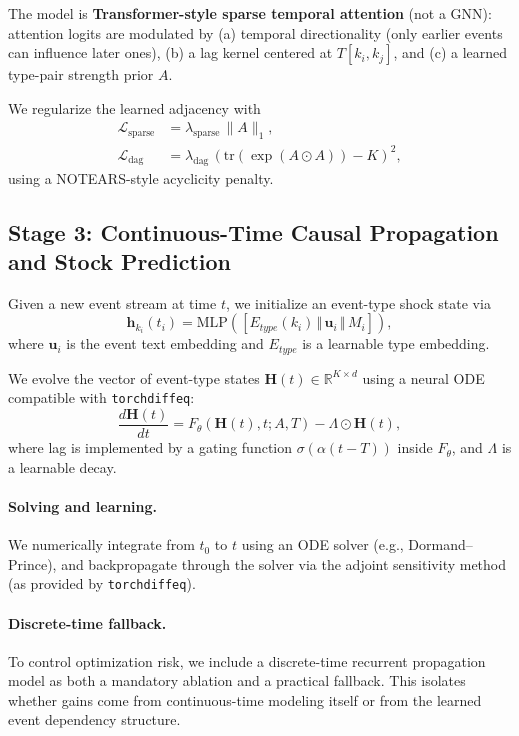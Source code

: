 \documentclass[sigconf,review]{acmart}
\begin{document}
The model is \textbf{Transformer-style sparse temporal attention} (not a GNN): attention logits are modulated by (a) temporal directionality (only earlier events can influence later ones), (b) a lag kernel centered at \(T[k_i,k_j]\), and (c) a learned type-pair strength prior \(A\).

We regularize the learned adjacency with
\begin{align}
\mathcal{L}_{\text{sparse}} &= \lambda_{\text{sparse}}\,\|A\|_1,\\
\mathcal{L}_{\text{dag}} &= \lambda_{\text{dag}}\,(\mathrm{tr}(\exp(A\odot A))-K)^2,
\end{align}
using a NOTEARS-style acyclicity penalty.

\subsection{Stage 3: Continuous-Time Causal Propagation and Stock Prediction}
Given a new event stream at time \(t\), we initialize an event-type shock state via
\begin{equation}
\mathbf{h}_{k_i}(t_i)=\mathrm{MLP}([E_{type}(k_i)\,\Vert\,\mathbf{u}_i\,\Vert\,M_i]),
\end{equation}
where \(\mathbf{u}_i\) is the event text embedding and \(E_{type}\) is a learnable type embedding.

We evolve the vector of event-type states \(\mathbf{H}(t)\in\mathbb{R}^{K\times d}\) using a neural ODE compatible with \texttt{torchdiffeq}:
\begin{equation}
\frac{d\mathbf{H}(t)}{dt} = F_\theta(\mathbf{H}(t), t; A,T) - \Lambda\odot \mathbf{H}(t),
\end{equation}
where lag is implemented by a gating function \(\sigma(\alpha(t-T))\) inside \(F_\theta\), and \(\Lambda\) is a learnable decay.

\paragraph{Solving and learning.} We numerically integrate from \(t_0\) to \(t\) using an ODE solver (e.g., Dormand--Prince), and backpropagate through the solver via the adjoint sensitivity method (as provided by \texttt{torchdiffeq}).

\paragraph{Discrete-time fallback.} To control optimization risk, we include a discrete-time recurrent propagation model as both a mandatory ablation and a practical fallback. This isolates whether gains come from continuous-time modeling itself or from the learned event dependency structure.
\end{document}

